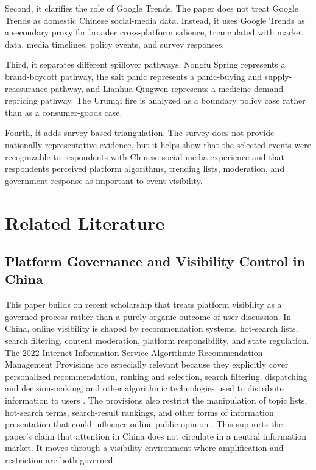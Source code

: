 \documentclass[conference]{IEEEtran}
\begin{document}
Second, it clarifies the role of Google Trends. The paper does not treat Google Trends as domestic Chinese social-media data. Instead, it uses Google Trends as a secondary proxy for broader cross-platform salience, triangulated with market data, media timelines, policy events, and survey responses.

Third, it separates different spillover pathways. Nongfu Spring represents a brand-boycott pathway, the salt panic represents a panic-buying and supply-reassurance pathway, and Lianhua Qingwen represents a medicine-demand repricing pathway. The Urumqi fire is analyzed as a boundary policy case rather than as a consumer-goods case.

Fourth, it adds survey-based triangulation. The survey does not provide nationally representative evidence, but it helps show that the selected events were recognizable to respondents with Chinese social-media experience and that respondents perceived platform algorithms, trending lists, moderation, and government response as important to event visibility.

\section{Related Literature}

\subsection{Platform Governance and Visibility Control in China}

This paper builds on recent scholarship that treats platform visibility as a governed process rather than a purely organic outcome of user discussion. In China, online visibility is shaped by recommendation systems, hot-search lists, search filtering, content moderation, platform responsibility, and state regulation. The 2022 Internet Information Service Algorithmic Recommendation Management Provisions are especially relevant because they explicitly cover personalized recommendation, ranking and selection, search filtering, dispatching and decision-making, and other algorithmic technologies used to distribute information to users \cite{digichina2022algorithmic}. The provisions also restrict the manipulation of topic lists, hot-search terms, search-result rankings, and other forms of information presentation that could influence online public opinion \cite{digichina2022algorithmic}. This supports the paper's claim that attention in China does not circulate in a neutral information market. It moves through a visibility environment where amplification and restriction are both governed.
\end{document}

